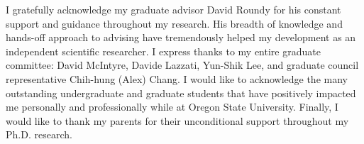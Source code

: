 I gratefully acknowledge my graduate advisor David Roundy for his constant
support and guidance throughout my research. His breadth of knowledge and
hands-off approach to advising have tremendously helped my development as an
independent scientific researcher. I express thanks to my entire graduate
committee: David McIntyre, Davide Lazzati, Yun-Shik Lee, and graduate council
representative Chih-hung (Alex) Chang. I would like to acknowledge the many
outstanding undergraduate and graduate students that have positively impacted
me personally and professionally while at Oregon State University. Finally, I
would like to thank my parents for their unconditional support throughout my
Ph.D. research.